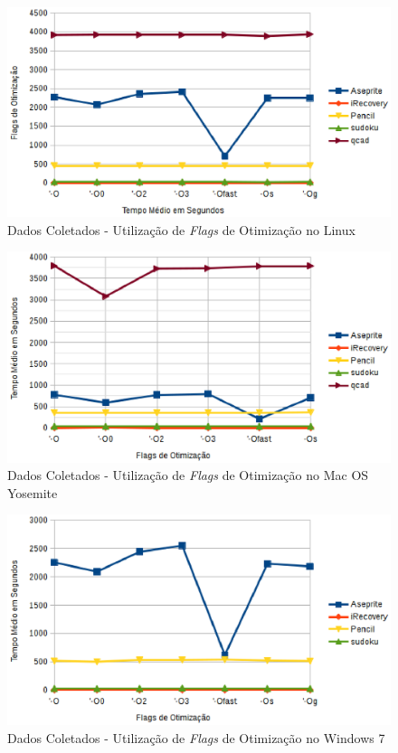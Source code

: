 \begin{apendicesenv}
        
\begin{figure}[!h]
    \centering
        \includegraphics{figuras/graficos/linux_otimizacao.eps}
    \caption{Dados Coletados - Utilização de \textit{Flags} de Otimização no Linux}
    \label{flags_de_otimizacao_linux}
\end{figure}

\begin{figure}[!h]
    \centering
        \includegraphics{figuras/graficos/mac_os_otimizacao.eps}
    \caption{Dados Coletados - Utilização de \textit{Flags} de Otimização no Mac OS Yosemite}
    \label{flags_de_otimizacao_mac_os}
\end{figure}


\begin{figure}[!h]
    \centering
        \includegraphics{figuras/graficos/windows_otimizacao.eps}
    \caption{Dados Coletados - Utilização de \textit{Flags} de Otimização no Windows 7}
    \label{flags_de_otimizacao_windows}
\end{figure}



\end{apendicesenv}
